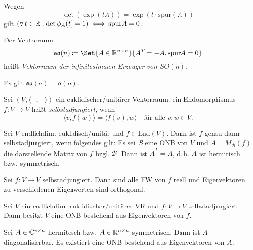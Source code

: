 \documentclass{cheat-sheet}
\newcommand{\End}{\mathrm{End}}
\newcommand{\spur}{\mathrm{spur}}
\newcommand{\BB}{\mathcal{B}}
\begin{document}
\begin{bem}
Wegen
\[ \det(\exp(tA)) = \exp(t \cdot \spur(A)) \]
gilt $(\forall\,t \in \R : \det \phi_A(t) = 1) \iff \spur A = 0$.
\end{bem}

\begin{defn}
Der Vektorraum
\[ \mathfrak{so}(n) \coloneqq \Set{ A \in \R^{n \times n} }{ A^T = - A, \spur A = 0 } \]
heißt \emph{Vektorraum der infinitesimalen Erzeuger von $SO(n)$}.
\end{defn}

\begin{satz}
Es gilt $\mathfrak{so}(n) = \mathfrak{o}(n)$.
\end{satz}



\begin{defn}
Sei $(V, \langle - , - \rangle)$ ein euklidischer/unitärer Vektorraum. ein Endomorphismus $f : V \to V$ heißt \emph{selbstadjungiert}, wenn
\[ \langle v, f(w) \rangle = \langle f(v), w \rangle \quad \text{für alle $v, w \in V$.} \]
\end{defn}


\begin{satz}
Sei $V$ endlichdim. euklidisch/unitär und $f \in \End(V)$. Dann ist $f$ genau dann selbstadjungiert, wenn folgendes gilt: Es sei $\BB$ eine ONB von $V$ und $A = M_\BB(f)$ die darstellende Matrix von $f$ bzgl. $\BB$. Dann ist $\overline{A}^T = A$, d.\,h. $A$ ist hermitisch bzw. symmetrisch.
\end{satz}

\begin{satz}
Sei $f : V \to V$ selbstadjungiert. Dann sind alle EW von $f$ reell und Eigenvektoren zu verschiedenen Eigenwerten sind orthogonal.
\end{satz}

\begin{satz}
Sei $V$ ein endlichdim. euklidischer/unitärer VR und $f : V \to V$ selbstadjungiert. Dann besitzt $V$ eine ONB bestehend aus Eigenvektoren von $f$.
\end{satz}

\begin{kor}
Sei $A \in \mathbb{C}^{n \times n}$ hermitesch bzw. $A \in \mathbb{R}^{n \times n}$ symmetrisch. Dann ist $A$ diagonalisierbar. Es existiert eine ONB bestehend aus Eigenvektoren von $A$.
\end{kor}
\end{document}
